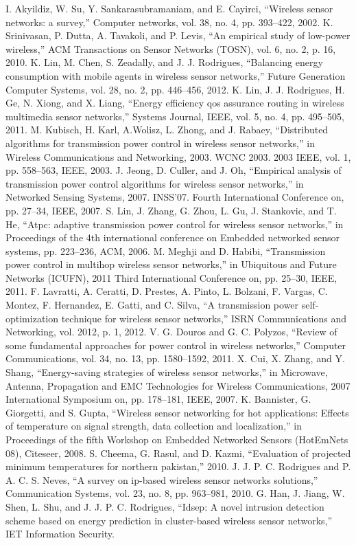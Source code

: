 \documentclass[12pt, conference, compsocconf, onecolumn, draftcls]{IEEEtran}
\begin{document}
\begin{thebibliography}{01}

 I. Akyildiz, W. Su, Y. Sankarasubramaniam, and E. Cayirci, “Wireless sensor networks: a survey,” Computer networks,
vol. 38, no. 4, pp. 393–422, 2002.
 K. Srinivasan, P. Dutta, A. Tavakoli, and P. Levis, “An empirical study of low-power wireless,” ACM Transactions on
Sensor Networks (TOSN), vol. 6, no. 2, p. 16, 2010.
 K. Lin, M. Chen, S. Zeadally, and J. J. Rodrigues, “Balancing energy consumption with mobile agents in wireless sensor
networks,” Future Generation Computer Systems, vol. 28, no. 2, pp. 446–456, 2012.
 K. Lin, J. J. Rodrigues, H. Ge, N. Xiong, and X. Liang, “Energy efficiency qos assurance routing in wireless multimedia
sensor networks,” Systems Journal, IEEE, vol. 5, no. 4, pp. 495–505, 2011.
 M. Kubisch, H. Karl, A.Wolisz, L. Zhong, and J. Rabaey, “Distributed algorithms for transmission power control in wireless
sensor networks,” in Wireless Communications and Networking, 2003. WCNC 2003. 2003 IEEE, vol. 1, pp. 558–563, IEEE,
2003.
 J. Jeong, D. Culler, and J. Oh, “Empirical analysis of transmission power control algorithms for wireless sensor networks,”
in Networked Sensing Systems, 2007. INSS’07. Fourth International Conference on, pp. 27–34, IEEE, 2007.
 S. Lin, J. Zhang, G. Zhou, L. Gu, J. Stankovic, and T. He, “Atpc: adaptive transmission power control for wireless sensor
networks,” in Proceedings of the 4th international conference on Embedded networked sensor systems, pp. 223–236, ACM,
2006.
 M. Meghji and D. Habibi, “Transmission power control in multihop wireless sensor networks,” in Ubiquitous and Future
Networks (ICUFN), 2011 Third International Conference on, pp. 25–30, IEEE, 2011.
 F. Lavratti, A. Ceratti, D. Prestes, A. Pinto, L. Bolzani, F. Vargas, C. Montez, F. Hernandez, E. Gatti, and C. Silva, “A
transmission power self-optimization technique for wireless sensor networks,” ISRN Communications and Networking,
vol. 2012, p. 1, 2012.
 V. G. Douros and G. C. Polyzos, “Review of some fundamental approaches for power control in wireless networks,”
Computer Communications, vol. 34, no. 13, pp. 1580–1592, 2011.
 X. Cui, X. Zhang, and Y. Shang, “Energy-saving strategies of wireless sensor networks,” in Microwave, Antenna,
Propagation and EMC Technologies for Wireless Communications, 2007 International Symposium on, pp. 178–181, IEEE,
2007.
 K. Bannister, G. Giorgetti, and S. Gupta, “Wireless sensor networking for hot applications: Effects of temperature on
signal strength, data collection and localization,” in Proceedings of the fifth Workshop on Embedded Networked Sensors
(HotEmNets 08), Citeseer, 2008.
 S. Cheema, G. Rasul, and D. Kazmi, “Evaluation of projected minimum temperatures for northern pakistan,” 2010.
 J. J. P. C. Rodrigues and P. A. C. S. Neves, “A survey on ip-based wireless sensor networks solutions,” Communication
Systems, vol. 23, no. 8, pp. 963–981, 2010.
 G. Han, J. Jiang, W. Shen, L. Shu, and J. J. P. C. Rodrigues, “Idsep: A novel intrusion detection scheme based on energy
prediction in cluster-based wireless sensor networks,” IET Information Security.

\end{thebibliography}
\end{document}
